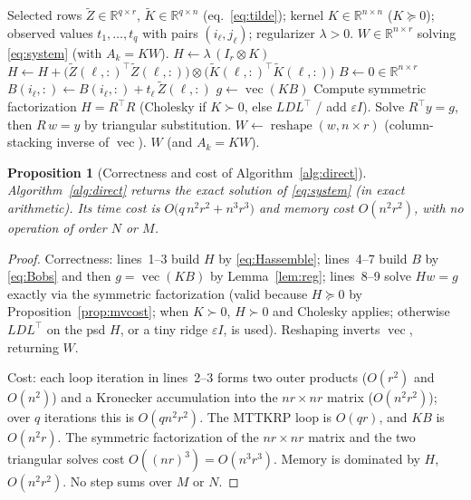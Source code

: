 \documentclass[12pt]{article}
\DeclareMathOperator{\vecop}{vec}
\newcommand{\bR}{\mathbb{R}}
\newcommand{\tZ}{\tilde Z}
\newcommand{\tK}{\tilde K}
\newtheorem{proposition}{Proposition}
\theoremstyle{definition}
\begin{document}
\begin{algorithm}[t]
\caption{Direct symmetric solver for the RKHS mode-$k$ subproblem}
\label{alg:direct}
\begin{algorithmic}[1]
\Require Selected rows $\tZ\in\bR^{q\times r}$, $\tK\in\bR^{q\times n}$
(eq.~\eqref{eq:tilde}); kernel $K\in\bR^{n\times n}$ ($K\succeq0$); observed values
$t_1,\dots,t_q$ with pairs $(i_\ell,j_\ell)$; regularizer $\lambda>0$.
\Ensure $W\in\bR^{n\times r}$ solving \eqref{eq:system} (with $A_k=KW$).
\State $H\gets \lambda\,(I_r\otimes K)$ 
  \State $H\gets H+\big(\tZ(\ell,:)^\top\tZ(\ell,:)\big)\otimes
  \big(\tK(\ell,:)^\top\tK(\ell,:)\big)$ 
\EndFor
\State $B\gets 0\in\bR^{n\times r}$
  \State $B(i_\ell,:)\gets B(i_\ell,:)+t_\ell\,\tZ(\ell,:)$ 
\EndFor
\State $g\gets \vecop(KB)$ 
\State Compute symmetric factorization $H=R^\top R$ (Cholesky if $K\succ0$, else
$LDL^\top$ / add $\varepsilon I$).
\State Solve $R^\top y=g$, then $R\,w=y$ by triangular substitution.
\State $W\gets \operatorname{reshape}(w,n\times r)$ (column-stacking inverse of $\vecop$).
\State \Return $W$ \quad(and $A_k=KW$).
\end{algorithmic}
\end{algorithm}

\begin{proposition}[Correctness and cost of Algorithm~\ref{alg:direct}]
\label{prop:direct}
Algorithm~\ref{alg:direct} returns the exact solution of \eqref{eq:system}
(in exact arithmetic). Its time cost is
$O\!\big(q\,n^2 r^2+n^3 r^3\big)$ and memory cost $O(n^2 r^2)$, with no operation of
order $N$ or $M$.
\end{proposition}

\begin{proof}
Correctness: lines~1--3 build $H$ by \eqref{eq:Hassemble}; lines~4--7 build $B$ by
\eqref{eq:Bobs} and then $g=\vecop(KB)$ by Lemma~\ref{lem:reg}; lines~8--9 solve
$Hw=g$ exactly via the symmetric factorization (valid because $H\succeq0$ by
Proposition~\ref{prop:mvcost}; when $K\succ0$, $H\succ0$ and Cholesky applies;
otherwise $LDL^\top$ on the psd $H$, or a tiny ridge $\varepsilon I$, is used).
Reshaping inverts $\vecop$, returning $W$.

Cost: each loop iteration in lines~2--3 forms two outer products
($O(r^2)$ and $O(n^2)$) and a Kronecker accumulation into the $nr\times nr$ matrix
($O(n^2 r^2)$); over $q$ iterations this is $O(q n^2 r^2)$. The MTTKRP loop is
$O(qr)$, and $KB$ is $O(n^2 r)$. The symmetric factorization of the
$nr\times nr$ matrix and the two triangular solves cost $O((nr)^3)=O(n^3 r^3)$.
Memory is dominated by $H$, $O(n^2 r^2)$. No step sums over $M$ or $N$.
\end{proof}
\end{document}
